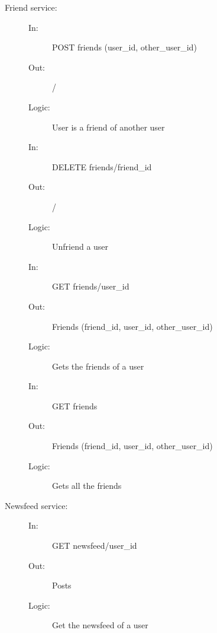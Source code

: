 \documentclass{article}
\begin{document}
\begin{description}
    \item [Friend service:] 
    \begin{description}
        \item[]
        \item[In:] POST friends (user\_id, other\_user\_id)
        \item[Out:] /
        \item[Logic:] User is a friend of another user
        \item[]
    \end{description}
    \begin{description}
        \item[In:] DELETE friends/friend\_id
        \item[Out:] /
        \item[Logic:] Unfriend a user
        \item[]
    \end{description}
    \begin{description}
        \item[In:] GET friends/user\_id
        \item[Out:] Friends (friend\_id, user\_id, other\_user\_id)
        \item[Logic:] Gets the friends of a user
        \item[]
    \end{description}
    \begin{description}
        \item[In:] GET friends
        \item[Out:] Friends (friend\_id, user\_id, other\_user\_id)
        \item[Logic:] Gets all the friends
    \end{description}
\end{description}

\begin{description}
    \item [Newsfeed service:] 
    \begin{description}
        \item[]
        \item[In:] GET newsfeed/user\_id
        \item[Out:] Posts
        \item[Logic:] Get the newsfeed of a user
    \end{description}
\end{description}
\end{document}
